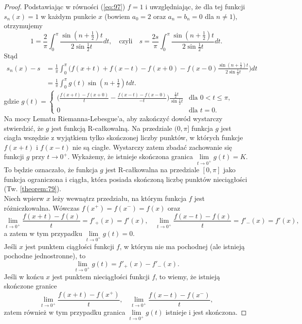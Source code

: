 \documentclass[leqno]{article}
\begin{document}
\begin{justify}
\begin{proof}
    Podstawiając w równości (\ref{eq:97}) $f = 1$ i uwzględniając, że dla tej funkcji $s_n(x) = 1$ w każdym punkcie $x$ (bowiem $a_0 = 2$ oraz $a_n = b_n = 0$ dla $n \neq 1$), otrzymujemy 
    \[
        1 = \frac{2}{\pi}\int_{0}^{\pi}\frac{\sin (n + \frac{1}{2})t}{2 \sin \frac{1}{2}t}dt, \quad \text{czyli} \quad s = \frac{2s}{\pi}\int_{0}^{\pi}\frac{\sin (n + \frac{1}{2})t}{2 \sin \frac{1}{2}t}dt.
    \]
    Stąd
    \begin{align*}
        s_n(x) - s &= \frac{1}{\pi} \int_{0}^{\pi}\Bigg ( f(x + t) + f(x - t) - f(x + 0) - f(x - 0) \frac{\sin (n + \frac{1}{2})t}{2 \sin \frac{1}{2}t} \Bigg)dt \\ 
                    &= \frac{1}{\pi} \int_{0}^{\pi}g(t) \sin (n + \frac{1}{2})t dt.
    \end{align*}
    gdzie $g(t) = \begin{cases} 
       \Big( \frac{f(x + t) - f(x + 0)}{t} - \frac{f(x - t) - f(x - 0)}{-t}\Big) \frac{\frac{1}{2}t}{\sin \frac{1}{2}t} & \text{dla } 0 < t \leqslant \pi, \\    
       0 & \text{dla } t = 0. 
    \end{cases}$ \\
    Na mocy Lematu Riemanna-Lebesgue'a, aby zakończyć dowód wystarczy stwierdzić, że $g$ jest funkcją R-całkowalną. Na przedziale $(0, \pi]$ funkcja $g$ jest ciagła wszędzie z wyjątkiem
    tylko skończonej liczby punktów, w których funkcje $f(x + t)$ i $f(x - t)$ nie są ciagłe. Wystarczy zatem zbadać zachowanie się funkcji $g$ przy $t \to 0^+$. 
    Wykażemy, że istnieje skończona granica $\lim\limits_{t \to 0^+}g(t) = K$. To będzie oznaczało, że funkcja $g$ jest R-całkowalna na przedziale $[0, \pi]$ jako funkcja ograniczona i 
    ciągła, która posiada skończoną liczbę punktów nieciągłości (Tw. \ref{theorem:79}). \\
    Niech wpierw $x$ leży wewnątrz przedziału, na którym funkcja $f$ jest różniczkowalna. Wówczas $f(x^+) = f(x^-) = f(x)$ oraz 
    \[
        \lim_{t \to 0^+}\frac{f(x + t) - f(x)}{t}=f'_+(x) = f'(x), \quad \lim_{t \to 0^+}\frac{f(x - t) - f(x)}{t} = f'_-(x) = f'(x),
    \]
    a zatem w tym przypadku $\lim\limits_{t \to 0^+}g(t) = 0$. \\
    Jeśli $x$ jest punktem ciągłości funkcji $f$, w którym nie ma pochodnej (ale istnieją pochodne jednostronne), to 
    \[
        \lim_{t \to 0^+}g(t) = f'_+(x) - f'_-(x).
    \]
    Jeśli w końcu $x$ jest punktem nieciągłości funkcji $f$, to wiemy, że istnieją skończone granice
    \[
        \lim_{t \to 0^+}\frac{f(x + t) - f(x^+)}{t}, \quad \lim_{t \to 0^+}\frac{f(x - t) - f(x^-)}{t},
    \]
    zatem również w tym przypadku granica  $\lim\limits_{t \to 0^+}g(t)$ istnieje i jest skończona. 
\end{proof}

\end{justify}
\end{document}
